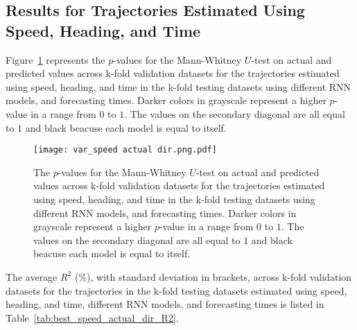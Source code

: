 \subsection{Results for Trajectories Estimated Using Speed, Heading, and Time}

Figure~\ref{fig:var_speed actual dir.png} represents the $p$-values for the Mann-Whitney $U$-test on actual and predicted values across k-fold validation datasets for the trajectories estimated using speed, heading, and time in the k-fold testing datasets using different RNN models, and forecasting times. Darker colors in grayscale represent a higher $p$-value in a range from $0$ to $1$. The values on the secondary diagonal are all equal to $1$ and black beacuse each model is equal to itself.

\begin{figure}[!ht]
	\centering
	\texttt{[image: var\_speed actual dir.png.pdf]}
	\caption{The $p$-values for the Mann-Whitney $U$-test on actual and predicted values across k-fold validation datasets for the trajectories estimated using speed, heading, and time in the k-fold testing datasets using different RNN models, and forecasting times. Darker colors in grayscale represent a higher $p$-value in a range from $0$ to $1$. The values on the secondary diagonal are all equal to $1$ and black beacuse each model is equal to itself.}
	\label{fig:var_speed actual dir.png}
\end{figure}

The average $R^{2}$ (\%), with standard deviation in brackets, across k-fold validation datasets for the trajectories in the k-fold testing datasets estimated using speed, heading, and time, different RNN models, and forecasting times is listed in Table~\ref{tab:best_speed_actual_dir_R2}.

